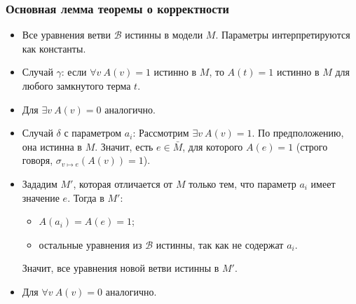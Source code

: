 \documentclass[10pt]{beamer}
\begin{document}
\begin{frame}
    \frametitle{Основная лемма теоремы о корректности}
    \begin{itemize}
        \item Все уравнения ветви $\mathcal{B}$ истинны в модели $M$. Параметры интерпретируются как константы.
        \item Случай $\gamma$: если $\forall v ~ A(v)=1$ истинно в $M$, то $A(t)=1$ истинно в $M$ для любого замкнутого терма $t$.
        \item Для $\exists v ~ A(v)=0$ аналогично.
        \pause
        \item Случай $\delta$ с параметром $a_i$: Рассмотрим $\exists v ~ A(v)=1$. По предположению, она истинна в $M$. Значит, есть $e \in \bar{M}$, для которого $A(e) = 1$ \pause (строго говоря, $\sigma_{v \mapsto e}(A(v)) = 1$).
        \item Зададим $M'$, которая отличается от $M$ только тем, что параметр $a_i$ имеет значение $e$. Тогда в $M'$: \begin{itemize}
            \item $A(a_i) = A(e) = 1$; 
            \item остальные уравнения из $\mathcal{B}$ истинны, так как \pause не содержат $a_i$.
        \end{itemize}
        Значит, все уравнения новой ветви истинны в $M'$.
        \item Для $\forall v ~ A(v)=0$ аналогично.
    \end{itemize}
\end{frame}
\end{document}
